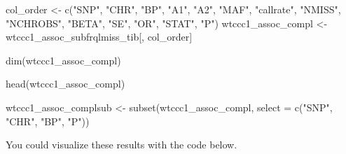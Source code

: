 \documentclass[
]{book}
\newenvironment{Shaded}{\begin{snugshade}}{\end{snugshade}}
\newcommand{\AttributeTok}[1]{\textcolor[rgb]{0.77,0.63,0.00}{#1}}
\newcommand{\FunctionTok}[1]{\textcolor[rgb]{0.00,0.00,0.00}{#1}}
\newcommand{\NormalTok}[1]{#1}
\newcommand{\OtherTok}[1]{\textcolor[rgb]{0.56,0.35,0.01}{#1}}
\newcommand{\StringTok}[1]{\textcolor[rgb]{0.31,0.60,0.02}{#1}}
\begin{document}
\begin{Shaded}
\begin{Highlighting}[]
\NormalTok{col\_order }\OtherTok{\textless{}{-}} \FunctionTok{c}\NormalTok{(}\StringTok{"SNP"}\NormalTok{, }\StringTok{"CHR"}\NormalTok{, }\StringTok{"BP"}\NormalTok{,}
               \StringTok{"A1"}\NormalTok{, }\StringTok{"A2"}\NormalTok{, }\StringTok{"MAF"}\NormalTok{, }\StringTok{"callrate"}\NormalTok{, }\StringTok{"NMISS"}\NormalTok{, }\StringTok{"NCHROBS"}\NormalTok{,}
               \StringTok{"BETA"}\NormalTok{, }\StringTok{"SE"}\NormalTok{, }\StringTok{"OR"}\NormalTok{, }\StringTok{"STAT"}\NormalTok{, }\StringTok{"P"}\NormalTok{)}
\NormalTok{wtccc1\_assoc\_compl }\OtherTok{\textless{}{-}}\NormalTok{ wtccc1\_assoc\_subfrqlmiss\_tib[, col\_order]}

\FunctionTok{dim}\NormalTok{(wtccc1\_assoc\_compl)}

\FunctionTok{head}\NormalTok{(wtccc1\_assoc\_compl)}

\NormalTok{wtccc1\_assoc\_complsub }\OtherTok{\textless{}{-}} \FunctionTok{subset}\NormalTok{(wtccc1\_assoc\_compl, }\AttributeTok{select =} \FunctionTok{c}\NormalTok{(}\StringTok{"SNP"}\NormalTok{, }\StringTok{"CHR"}\NormalTok{, }\StringTok{"BP"}\NormalTok{, }\StringTok{"P"}\NormalTok{))}
\end{Highlighting}
\end{Shaded}

You could visualize these results with the code below.
\end{document}
